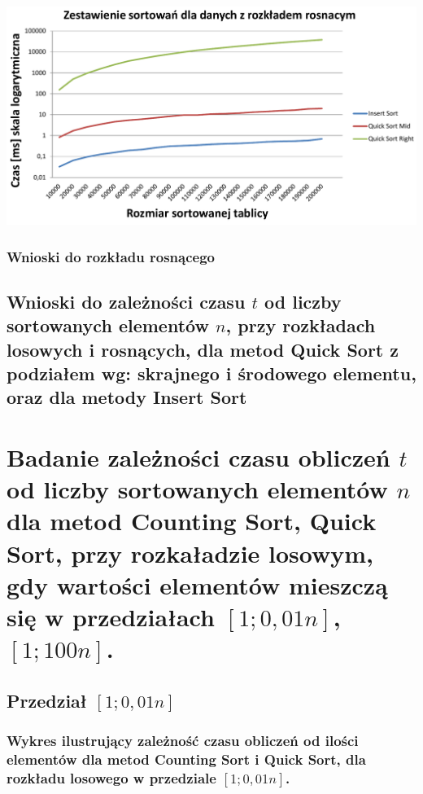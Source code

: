 \documentclass[polish,polish,a4paper]{article}
\begin{document}
\begin{spacing}{1.5}
\begin{minipage}[H]{\textwidth}
	\begin{center}
		\includegraphics[scale=0.6]{zad3rosnacylog.pdf}
		\label{fig:zad3roslog}
	\end{center}
\end{minipage}


\subsubsection{Wnioski do rozkładu rosnącego}

\subsection{Wnioski do zależności czasu $t$ od liczby sortowanych elementów $n$, przy rozkładach losowych i rosnących, dla metod Quick Sort z podziałem wg: skrajnego i środowego elementu, oraz dla metody Insert Sort}

\section{Badanie zależności czasu obliczeń $t$ od liczby sortowanych elementów $n$ dla metod Counting Sort, Quick Sort, przy rozkaładzie losowym, gdy wartości elementów mieszczą się w przedziałach  $ [1;0,01n] $,$ [1;100n] $. }

\subsection{Przedział $[1;0,01n]$}

\subsubsection*{Wykres ilustrujący zależność czasu obliczeń od ilości elementów dla metod Counting Sort i  Quick Sort, dla rozkładu losowego w przedziale $[1;0,01n]$.}
	

\end{spacing}
\end{document}
